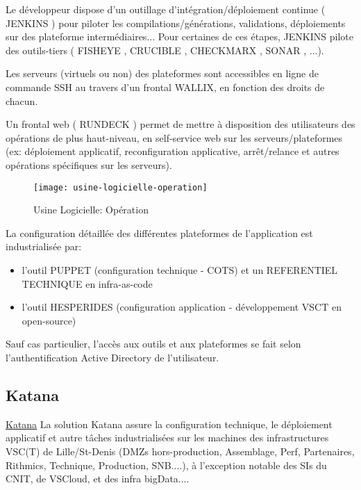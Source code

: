 Le développeur dispose d'un outillage d'intégration/déploiement continue ( JENKINS ) pour piloter les compilations/générations, validations, déploiements sur des plateforme intermédiaires...
Pour certaines de ces étapes, JENKINS pilote des outils-tiers ( FISHEYE , CRUCIBLE , CHECKMARX , SONAR , ...).

Les serveurs (virtuels ou non) des plateformes sont accessibles en ligne de commande SSH au travers d'un frontal WALLIX, en fonction des droits de chacun.

Un frontal web ( RUNDECK ) permet de mettre à disposition des utilisateurs des opérations de plus haut-niveau, en self-service web sur les serveurs/plateformes (ex: déploiement applicatif, reconfiguration applicative, arrêt/relance et autres opérations spécifiques sur les serveurs).

\begin{figure}[h]
\centering
\texttt{[image: usine-logicielle-operation]}
\caption{Usine Logicielle: Opération}
\end{figure}

La configuration détaillée des différentes plateformes de l'application est industrialisée par:
\begin{itemize}
  \item l'outil PUPPET (configuration technique - COTS) et un REFERENTIEL TECHNIQUE en infra-as-code
  \item l'outil HESPERIDES (configuration application - développement VSCT en open-source)
\end{itemize}

Sauf cas particulier, l'accès aux outils et aux plateformes se fait selon l'authentification Active Directory de l'utilisateur.
\subsection{Katana}

\href{https://wiki.vsct.fr/display/KTN/KATANA+Accueil}{Katana}
La solution Katana assure la configuration technique, le déploiement applicatif et autre tâches industrialisées sur les machines des infrastructures VSC(T) de Lille/St-Denis (DMZs hors-production, Assemblage, Perf, Partenaires, Rithmics, Technique, Production, SNB....), à l'exception notable des SIs du CNIT, de VSCloud, et des infra bigData....

